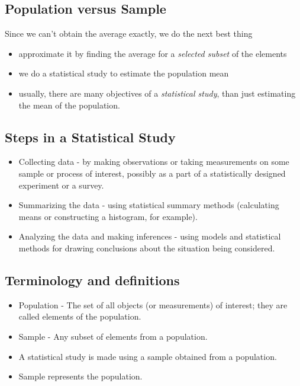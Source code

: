 \documentclass[
  letterpaper,
  DIV=11,
  numbers=noendperiod]{scrartcl}
\begin{document}
\subsection{Population versus Sample}\label{population-versus-sample}

Since we can't obtain the average exactly, we do the next best thing

\begin{itemize}
\item
  approximate it by finding the average for a {\emph{selected subset}}
  of the elements
\item
  we do a statistical study to estimate the population mean
\item
  usually, there are many objectives of a {\emph{statistical study}},
  than just estimating the mean of the population.
\end{itemize}

\subsection{Steps in a Statistical
Study}\label{steps-in-a-statistical-study}

\begin{itemize}
\item
  {Collecting data} - by making observations or taking measurements on
  some sample or process of interest, possibly as a part of a
  statistically designed experiment or a survey.
\item
  {Summarizing the data} - using statistical summary methods
  (calculating means or constructing a histogram, for example).
\item
  {Analyzing the data and making inferences} - using models and
  statistical methods for drawing conclusions about the situation being
  considered.
\end{itemize}

\subsection{Terminology and
definitions}\label{terminology-and-definitions}

\begin{itemize}
\item
  {Population} - The set of all objects (or measurements) of interest;
  they are called elements of the population.
\item
  {Sample} - Any subset of elements from a population.
\item
  A statistical study is made using a sample obtained from a population.
\item
  Sample represents the population.
\end{itemize}
\end{document}
